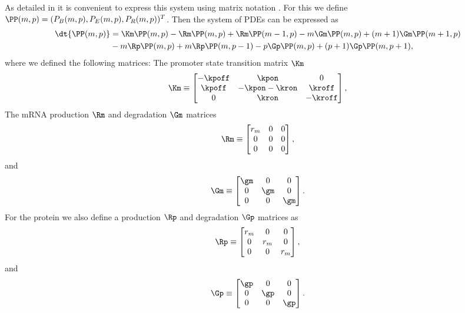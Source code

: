 As detailed in  it is convenient to express this system using
matrix notation \cite{Sanchez2013}. For this we define $\PP(m, p) = (P_B(m, p),
P_E(m, p), P_R(m, p))^T$. Then the system of PDEs can be expressed as
\begin{equation}
  \begin{aligned}
    \dt{\PP(m, p)} &= \Km \PP(m, p)
    - \Rm \PP(m, p) + \Rm \PP(m-1, p)
    - m \Gm \PP(m, p) + (m + 1) \Gm \PP(m + 1, p)\\
    &- m \Rp \PP(m, p) + m \Rp \PP(m, p - 1)
    - p \Gp \PP(m, p) + (p + 1) \Gp \PP(m, p + 1),
  \end{aligned}
\end{equation}
where we defined the following matrices: The promoter state transition matrix
$\Km$
\begin{align}
  \Km \equiv
  \begin{bmatrix}
    -\kpoff   & \kpon         & 0\\
    \kpoff    & -\kpon -\kron  & \kroff\\
    0         & \kron         & -\kroff
  \end{bmatrix},
\end{align}
The mRNA production $\Rm$ and degradation $\Gm$ matrices
\begin{equation}
  \Rm \equiv
  \begin{bmatrix}
    r_m   & 0 & 0\\
    0     & 0 & 0\\
    0     & 0 & 0\\
  \end{bmatrix},
\end{equation}
and
\begin{equation}
  \Gm \equiv
  \begin{bmatrix}
    \gm   & 0   & 0\\
    0     & \gm & 0\\
    0     & 0   & \gm\\
  \end{bmatrix}.
\end{equation}
For the protein we also define a production $\Rp$ and degradation $\Gp$ matrices
as
\begin{equation}
  \Rp \equiv
  \begin{bmatrix}
    r_m   & 0   & 0\\
    0     & r_m & 0\\
    0     & 0   & r_m\\
  \end{bmatrix},
\end{equation}
and
\begin{equation}
  \Gp \equiv
  \begin{bmatrix}
    \gp   & 0   & 0\\
    0     & \gp & 0\\
    0     & 0   & \gp\\
  \end{bmatrix}.
\end{equation}


